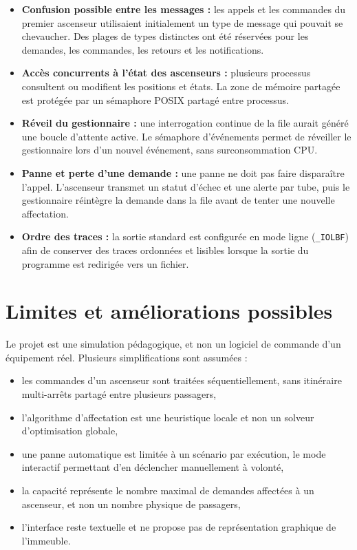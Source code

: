 \documentclass[11pt,a4paper]{article}
\begin{document}
\begin{itemize}
  \item \textbf{Confusion possible entre les messages :} les appels et les commandes du premier ascenseur utilisaient initialement un type de message qui pouvait se chevaucher. Des plages de types distinctes ont été réservées pour les demandes, les commandes, les retours et les notifications.
  \item \textbf{Accès concurrents à l'état des ascenseurs :} plusieurs processus consultent ou modifient les positions et états. La zone de mémoire partagée est protégée par un sémaphore POSIX partagé entre processus.
  \item \textbf{Réveil du gestionnaire :} une interrogation continue de la file aurait généré une boucle d'attente active. Le sémaphore d'événements permet de réveiller le gestionnaire lors d'un nouvel événement, sans surconsommation CPU.
  \item \textbf{Panne et perte d'une demande :} une panne ne doit pas faire disparaître l'appel. L'ascenseur transmet un statut d'échec et une alerte par tube, puis le gestionnaire réintègre la demande dans la file avant de tenter une nouvelle affectation.
  \item \textbf{Ordre des traces :} la sortie standard est configurée en mode ligne (\texttt{\_IOLBF}) afin de conserver des traces ordonnées et lisibles lorsque la sortie du programme est redirigée vers un fichier.
\end{itemize}

\section{Limites et améliorations possibles}

Le projet est une simulation pédagogique, et non un logiciel de commande d'un équipement réel. Plusieurs simplifications sont assumées :
\begin{itemize}
  \item les commandes d'un ascenseur sont traitées séquentiellement, sans itinéraire multi-arrêts partagé entre plusieurs passagers,
  \item l'algorithme d'affectation est une heuristique locale et non un solveur d'optimisation globale,
  \item une panne automatique est limitée à un scénario par exécution, le mode interactif permettant d'en déclencher manuellement à volonté,
  \item la capacité représente le nombre maximal de demandes affectées à un ascenseur, et non un nombre physique de passagers,
  \item l'interface reste textuelle et ne propose pas de représentation graphique de l'immeuble.
\end{itemize}
\end{document}

